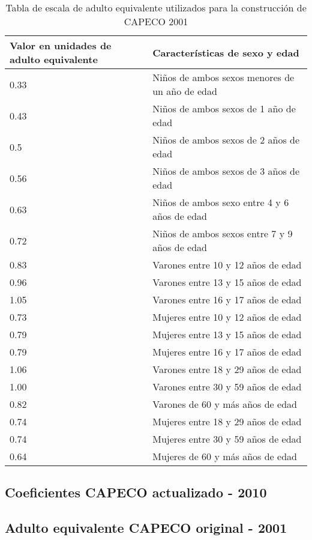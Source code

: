 \begin{table}[h!]
	\small
	\centering
	\label{tab:tableAE2001}
	\caption{Tabla de escala de adulto equivalente utilizados para la construcción de CAPECO 2001}
	\begin{tabular}{p{2cm}|p{6cm}}
		Valor en unidades de adulto equivalente & Características de sexo y edad \\
		\hline
		0.33&Niños de ambos sexos menores de un año de edad\\
		\hline		
		0.43&Niños de ambos sexos de 1 año de edad\\
		\hline		
		0.5&Niños de ambos sexos de 2 años de edad\\
		\hline		
		0.56&Niños de ambos sexos de 3 años de edad\\
		\hline		
		0.63&Niños de ambos sexo entre 4 y 6 años de edad\\
		\hline		
		0.72&Niños de ambos sexos entre 7 y 9 años de edad\\
		\hline		
		0.83&Varones entre 10 y 12 años de edad\\
		\hline		
		0.96&Varones entre 13 y 15 años de edad\\
		\hline		
		1.05&Varones entre 16 y 17 años de edad\\
		\hline		
		0.73&Mujeres entre 10 y 12 años de edad\\
		\hline		
		0.79&Mujeres entre 13 y 15 años de edad\\
		\hline		
		0.79&Mujeres entre 16 y 17 años de edad\\
		\hline		
		1.06&Varones entre 18 y 29 años de edad\\
		\hline		
		1.00&Varones entre 30 y 59 años de edad\\
		\hline		
		0.82&Varones de 60 y más años de edad\\
		\hline		
		0.74&Mujeres entre 18 y 29 años de edad\\
		\hline		
		0.74&Mujeres entre 30 y 59 años de edad\\
		\hline		
		0.64&Mujeres de 60 y más años de edad\\
	\end{tabular}
\end{table}


\subsection{Coeficientes CAPECO actualizado - 2010}

\subsection{Adulto equivalente CAPECO original - 2001}\label{anexo}